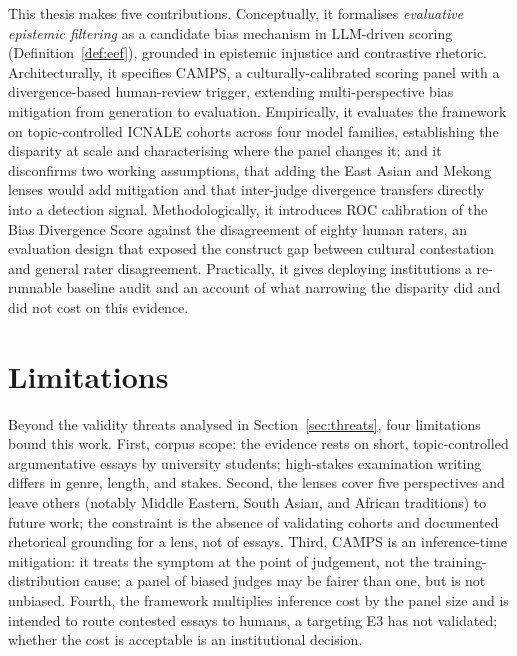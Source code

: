 This thesis makes five contributions. Conceptually, it formalises
\emph{evaluative epistemic filtering} as a candidate bias mechanism
in LLM-driven scoring (Definition~\ref{def:eef}), grounded in
epistemic injustice and contrastive rhetoric. Architecturally, it specifies
CAMPS, a culturally-calibrated scoring panel with a divergence-based
human-review trigger, extending multi-perspective bias mitigation
from generation \citep{dorleon2026uncovering} to evaluation. Empirically, it evaluates the framework on topic-controlled ICNALE
cohorts across four model families, establishing the disparity at
scale and characterising where the panel changes it; and it
disconfirms two working assumptions, that adding the East Asian and
Mekong lenses would add mitigation and that inter-judge divergence
transfers directly into a detection signal. Methodologically, it introduces ROC calibration of
the Bias Divergence Score against the disagreement of eighty human
raters, an evaluation design that exposed the construct gap between
cultural contestation and general rater disagreement. Practically,
it gives deploying institutions a re-runnable baseline audit and an
account of what narrowing the disparity did and did not cost on
this evidence.

\section{Limitations}
\label{sec:limitations}

Beyond the validity threats analysed in Section~\ref{sec:threats},
four limitations bound this work. First, corpus scope: the evidence
rests on short, topic-controlled argumentative essays by university
students; high-stakes examination writing differs in genre, length,
and stakes. Second, the lenses cover five perspectives and leave others
(notably Middle Eastern, South Asian, and African traditions) to
future work; the constraint is the absence of validating cohorts and
documented rhetorical grounding for a lens, not of essays. Third,
CAMPS is an inference-time mitigation: it treats the symptom at the
point of judgement, not the training-distribution cause; a panel of
biased judges may be fairer than one, but is not unbiased. Fourth,
the framework multiplies inference cost by the panel size and is
intended to route contested essays to humans, a targeting E3 has
not validated; whether the cost is acceptable is an institutional
decision.

